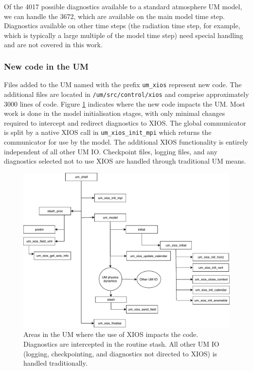 \documentclass[twocolumn, 5p, times]{elsarticle}
\begin{document}
Of the 4017 possible diagnostics available to a standard atmosphere UM model, we can handle the 3672, which are available on the main model time step. Diagnostics available on other time steps (the radiation time step, for example, which is typically a large multiple of the model time step) need special handling and are not covered in this work.


\subsubsection{New code in the UM} 
\label{new-code}
Files added to the UM named with the prefix \texttt{um\_xios} represent new code. The additional files are located in \texttt{/um/src/control/xios} and comprise approximately 3000 lines of code. Figure \ref{um-xios-code} indicates where the new code impacts the UM. Most work is done in the model initialisation stages, with only minimal changes required to intercept and redirect diagnostics to XIOS. The global communicator is split by a native XIOS call in \texttt{um\_xios\_init\_mpi} which returns the communicator for use by the model. The additional XIOS functionality is entirely independent of all other UM IO. Checkpoint files, logging files, and any diagnostics selected not to use XIOS are handled through traditional UM means.

\begin{figure}
	\centerline{
	\includegraphics[scale=0.5]{figures/UM-XIOS-code.pdf}}
	\caption {
                Areas in the UM where the use of XIOS impacts the code. Diagnostics are intercepted in the routine stash. All other UM IO (logging, checkpointing, and diagnostics not directed to XIOS) is handled traditionally.
		}\label{um-xios-code}
\end{figure}
\end{document}
